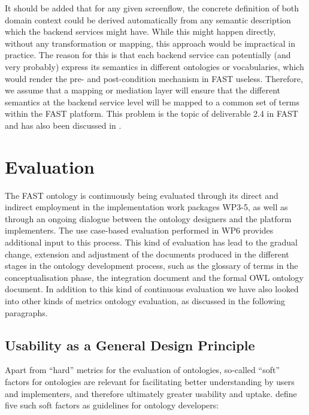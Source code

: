 \documentclass[twoside]{fast_latex}
\begin{document}
It should be added that for any given screenflow, the concrete definition of both domain context could be derived automatically from any semantic description which the backend services might have. While this might happen directly, without any transformation or mapping, this approach would be impractical in practice. The reason for this is that each backend service can potentially (and very probably) express its semantics in different ontologies or vocabularies, which would render the pre- and post-condition mechanism in FAST useless. Therefore, we assume that a mapping or mediation layer will ensure that the different semantics at the backend service level will be mapped to a common set of terms within the FAST platform. This problem is the topic of deliverable 2.4 in FAST~\cite{ambrus2010fast_mediation} and has also been discussed in \cite{Ambrus:2009it}.


\section{Evaluation} %
\label{sec:evaluation}

The FAST ontology is continuously being evaluated through its direct and indirect employment in the implementation work packages WP3-5, as well as through an ongoing dialogue between the ontology designers and the platform implementers. The use case-based evaluation performed in WP6 provides additional input to this process. 
This kind of evaluation has lead to the gradual change, extension and adjustment of the documents produced in the different stages in the ontology development process, such as the glossary of terms in the conceptualisation phase, the integration document and the formal OWL ontology document. In addition to this kind of continuous evaluation we have also looked into other kinds of metrics ontology evaluation, as discussed in the following paragraphs.


\subsection{Usability as a General Design Principle} %
\label{sub:general_design_decisions}

Apart from ``hard'' metrics for the evaluation of ontologies, so-called ``soft'' factors for ontologies are relevant for facilitating better understanding by users and implementers, and therefore ultimately greater usability and uptake. \cite{moeller2009ontology_soft_skills} define five such soft factors as guidelines for ontology developers:
\end{document}
